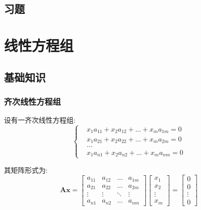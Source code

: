 \section{习题}
\chapter{线性方程组}
\section{基础知识}
\subsection{齐次线性方程组}
设有一齐次线性方程组:
\begin{equation*}
\left\{\begin{aligned}
& x_{1}a_{11}+x_{2}a_{12}+...+x_{m}a_{1m}=0 \\
& x_{1}a_{21}+x_{2}a_{22}+...+x_{m}a_{2m}=0 \\
& \dots \\
& x_{1}a_{n1}+x_{2}a_{n2}+...+x_{m}a_{nm}=0
\end{aligned}
\right.
\end{equation*}\par
其矩阵形式为:
\begin{equation*}
\bm{A}\bm{x}=\begin{bmatrix}
a_{11} & a_{12} & \dots & a_{1m} \\
a_{21} & a_{22} & \dots & a_{2m} \\
\vdots & \vdots & \ddots & \vdots \\
a_{n1} & a_{n2} & \dots & a_{nm}
\end{bmatrix}
\begin{bmatrix}
x_{1} \\
x_{2} \\
\vdots \\
x_{m}
\end{bmatrix}=
\begin{bmatrix}
0 \\
0 \\
\vdots \\
0
\end{bmatrix}
\end{equation*}

